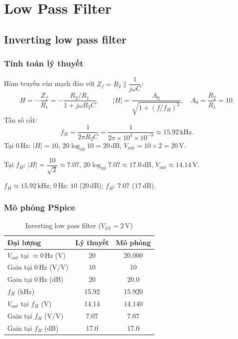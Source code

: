 \section{Low Pass Filter}\label{sec:lpf}

\subsection{Inverting low pass filter}\label{sec:lpf-a}

\subsubsection*{Tính toán lý thuyết}
Hàm truyền của mạch đảo với $Z_f = R_2 \parallel \dfrac{1}{j\omega C}$:
\[
H = -\frac{Z_f}{R_1} = -\frac{R_2/R_1}{1 + j\omega R_2 C},
\qquad
|H| = \frac{A_0}{\sqrt{1 + (f/f_H)^2}},\quad A_0 = \frac{R_2}{R_1} = 10.
\]
Tần số cắt:
\[
f_H = \frac{1}{2\pi R_2 C} = \frac{1}{2\pi \times 10^{4} \times 10^{-9}} \approx 15.92\,\text{kHz}.
\]
Tại $0\,\text{Hz}$: $|H| = 10$, $20\log_{10}10 = 20\,\text{dB}$, $V_{out} = 10 \times 2 = 20\,\text{V}$.

Tại $f_H$: $|H| = \dfrac{10}{\sqrt 2} \approx 7.07$, $20\log_{10}7.07 \approx 17.0\,\text{dB}$, $V_{out} \approx 14.14\,\text{V}$.

\begin{dapsobox}
$f_H \approx 15.92\,\text{kHz}$; \quad $0\,\text{Hz}$: $10$ ($20\,\text{dB}$); \quad $f_H$: $7.07$ ($17\,\text{dB}$).
\end{dapsobox}

\subsubsection*{Mô phỏng PSpice}
\simresult
{}

\begin{table}[H]
\centering
\begin{tabular}{l c c}
\toprule
\textbf{Đại lượng} & \textbf{Lý thuyết} & \textbf{Mô phỏng}\\
\midrule
$V_{out}$ tại $\approx 0\,\text{Hz}$ (V) & 20    & 20.000\\
Gain tại $0\,\text{Hz}$ (V/V)            & 10    & 10\\
Gain tại $0\,\text{Hz}$ (dB)             & 20    & 20.0\\
$f_H$ (kHz)                              & 15.92 & 15.920\\
$V_{out}$ tại $f_H$ (V)                  & 14.14 & 14.140\\
Gain tại $f_H$ (V/V)                     & 7.07  & 7.07\\
Gain tại $f_H$ (dB)                      & 17.0  & 17.0\\
\bottomrule
\end{tabular}
\caption{Inverting low pass filter ($V_{IN}=2\,\text{V}$)}
\end{table}

